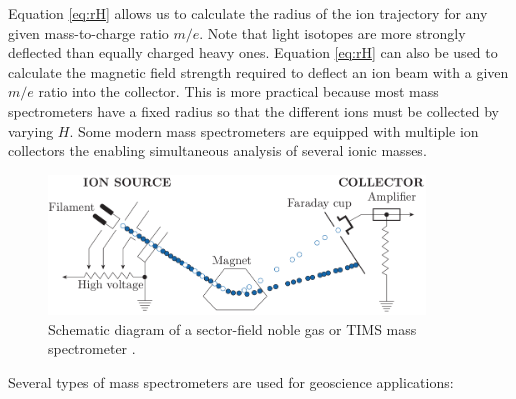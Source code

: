 \documentclass{book}
\newif\ifpdf
\begin{document}
Equation \ref{eq:rH} allows us to calculate the radius of the ion
trajectory for any given mass-to-charge ratio $m/e$. Note that light
isotopes are more strongly deflected than equally charged heavy ones.
Equation \ref{eq:rH} can also be used to calculate the magnetic field
strength required to deflect an ion beam with a given $m/e$ ratio into
the collector.  This is more practical because most mass spectrometers
have a fixed radius so that the different ions must be collected by
varying $H$. Some modern mass spectrometers are equipped with multiple
ion collectors the enabling simultaneous analysis of several ionic
masses.

\begin{figure}[!ht]
  \centering
  \ifpdf
  \def\svgwidth{\textwidth}
  
  \else
  \includegraphics[width=10cm]{mass-spec.png}
  \fi
  \caption{Schematic diagram of a sector-field noble gas or TIMS mass
    spectrometer \citep[modified from][]{allegre2008}.}
  \label{fig:mass-spec}
\end{figure}

Several types of mass spectrometers are used for geoscience
applications:
\end{document}

